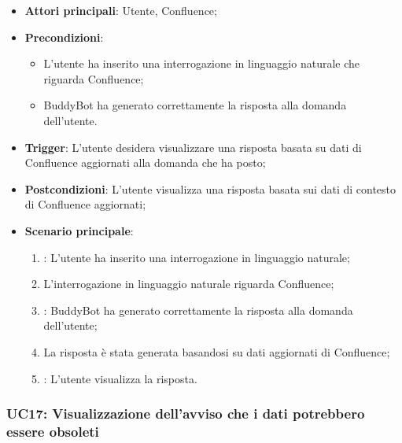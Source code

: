 \begin{itemize}
    \item \textbf{Attori principali}: Utente, Confluence;
    \item \textbf{Precondizioni}: 
    \begin{itemize}
        \item L'utente ha inserito una interrogazione in linguaggio naturale che riguarda Confluence;
        \item BuddyBot ha generato correttamente la risposta alla domanda dell'utente.
    \end{itemize}
    \item \textbf{Trigger}: L'utente desidera visualizzare una risposta basata su dati di Confluence aggiornati alla domanda che ha posto;
    \item \textbf{Postcondizioni}: L'utente visualizza una risposta basata sui dati di contesto di Confluence aggiornati;
    \item \textbf{Scenario principale}: 
    \begin{enumerate}
        \item {}: L'utente ha inserito una interrogazione in linguaggio naturale;
        \item L'interrogazione in linguaggio naturale riguarda Confluence;
        \item {}: BuddyBot ha generato correttamente la risposta alla domanda dell'utente;
        \item La risposta è stata generata basandosi su dati aggiornati di Confluence;
        \item {}: L'utente visualizza la risposta.
    \end{enumerate}
\end{itemize}



\hypertarget{UC17}{}
\subsubsection{UC17: Visualizzazione dell’avviso che i dati potrebbero essere obsoleti}

